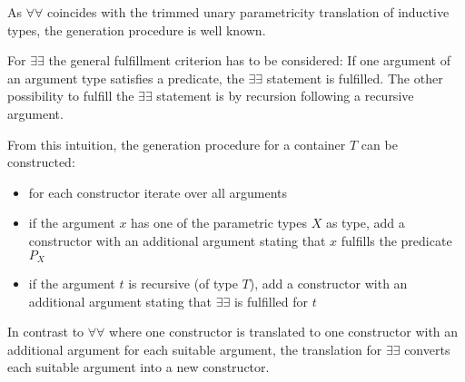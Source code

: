 As $\forall\forall$ coincides with the trimmed unary parametricity translation 
of inductive types, the generation procedure is well known.

For $\exists\exists$ the general fulfillment criterion has to be considered:
If one argument of an argument type satisfies a predicate, the $\exists\exists$ 
statement is fulfilled. The other possibility to fulfill the $\exists\exists$ statement
is by recursion following a recursive argument.

From this intuition, the generation procedure for a container $T$ can be constructed:
\begin{itemize}
    \item for each constructor iterate over all arguments
    \item if the argument $x$ has one of the parametric types $X$ as type,
        add a constructor with an additional argument stating that
            $x$ fulfills the predicate $P_X$
    \item if the argument $t$ is recursive (of type $T$), add a constructor 
        with an additional argument stating that $\exists\exists$ is fulfilled for $t$
\end{itemize}

In contrast to $\forall\forall$ where one constructor is translated to 
one constructor with an additional argument for each suitable argument,
the translation for $\exists\exists$ converts each suitable argument into a new constructor.



